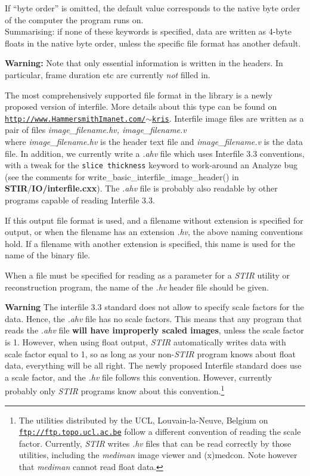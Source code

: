 \documentclass{article}
\def\R2Lurl#1#2{\mbox{\href{#1}{\tt #2}}}
\begin{document}
If ``byte order'' is omitted, the default value corresponds to 
the native byte order of the computer the program runs on.\\
Summarising: if none of these keywords is specified, data are 
written as 4-byte floats in the native byte order, unless the 
specific file format has another default.



\textbf{Warning:} Note that only essential information is written 
in the headers. In particular, frame duration etc are currently \textit{not} 
filled in.

{ 
}
\label{sec:outputinterfile}
The most comprehensively supported file format in the library 
is a newly proposed version of interfile. More details about 
this type can be found on \R2Lurl{http://www.HammersmithImanet.com/\ensuremath{\sim}kris}{http://www.HammersmithImanet.com/\ensuremath{\sim}kris}. 
Interfile image files are written as a pair of files
\textit{image\_filename.hv,
image\_filename.v}\\
where \textit{image\_filename.hv} is the header text file and \textit{image\_filename.v} 
is the data file. In addition, we currently write a \textit{.ahv} 
file which uses Interfile 3.3 conventions, with a tweak for the 
\texttt{slice thickness} keyword to work-around an Analyze\texttrademark{} 
bug (see the comments for write\_basic\_interfile\_image\_header() 
in \textbf{STIR}/\textbf{IO/interfile.cxx}). The \textit{.ahv} file is probably 
also readable by other programs capable of reading Interfile 
3.3.


If this output file format is used, and a filename without extension 
is specified for output, or when the filename has an extension \textit{.hv}, 
the above naming conventions hold. If a filename with another 
extension is specified, this name is used for the name of the 
binary file. 


When a file must be specified for reading as a parameter for 
a \textit{STIR} utility or reconstruction program, the name of the \textit{.hv} 
header file should be given. 



\textbf{Warning} The interfile 3.3 standard does not allow to specify 
scale factors for the data. Hence, the \textit{.ahv} file has no scale 
factors. This means that any program that reads the \textit{.ahv} 
file \textbf{will have improperly scaled images}, unless the scale 
factor is 1. However, when using float output, \textit{STIR} automatically 
writes data with scale factor equal to 1, so as long as your 
non-\textit{STIR} program knows about float data, everything will 
be all right. The newly proposed Interfile standard does use 
a scale factor, and the \textit{.hv} file follows this convention. 
However, currently probably only \textit{STIR} programs know about 
this convention.\footnote{{\small The utilities distributed by the UCL, 
Louvain-la-Neuve, Belgium on \R2Lurl{ftp://ftp.topo.ucl.ac.be }{ftp://ftp.topo.ucl.ac.be} 
follow a different convention of reading the scale factor. Currently, \textit{STIR} 
writes \textit{.hv} files that can be read correctly by those utilities, 
including the \textit{mediman} image viewer and (x)medcon. Note however 
that \textit{mediman} cannot read float data.}}
\end{document}
